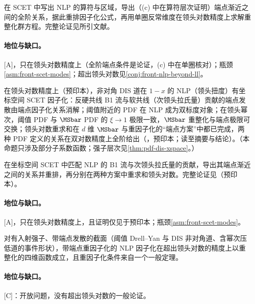 \begin{proofsketch}
在 SCET 中写出 NLP 的算符与区域，导出（(c) 中在算符层次证明）端点渐近之间的全阶关系，据此重排因子化公式，再用单圈反常维度在领头对数精度上求解重整化群方程。完整论证见所引文献。
\end{proofsketch}

\paragraph{地位与缺口。}[A]，只在领头对数精度上（全阶端点条件是论证，(c) 中在单圈核对）；瓶颈\cref{asm:front-scet-modes}；超出领头对数见\cref{conj:front-nlp-beyond-ll}。

\begin{proposition}\label{prop:front-nlp-dis}
在领头对数精度上（预印本），非对角 DIS 道在 $1-x$ 的 NLP（领头扭度）有坐标空间 SCET 因子化：反硬共线 B1 流与软共线（次领头拉氏量）贡献的端点发散由端点因子化关系消解；阈值附近的 PDF 在 NLP 成为双标度对象；在领头幂次，阈值 PDF 与 $\MSbar$ PDF 的 $\xi\to1$ 极限一致，$\MSbar$ 重整化与端点极限可交换；领头对数重求和在 $d$ 维 $\MSbar$ 与重因子化的“端点方案”中都已完成，两种 PDF 定义的关系在双对数精度上全阶给出（\cite{Beneke:2026miy}，预印本；读至摘要与结论）。（本命题只涉及部分子系数函数；强子层次见\cref{thm:pdf-dis-xspace}。）
\end{proposition}

\begin{proofsketch}
在坐标空间 SCET 中匹配 NLP 的 B1 流与次领头拉氏量的贡献，导出其端点渐近之间的关系并重排，再分别在两种方案中重求和领头对数。完整论证见\cite{Beneke:2026miy}（预印本）。
\end{proofsketch}

\paragraph{地位与缺口。}[A]，只在领头对数精度上，且证明仅见于预印本；瓶颈\cref{asm:front-scet-modes}。

\begin{conjecture}\label{conj:front-nlp-beyond-ll}
对有入射强子、带端点发散的截面（阈值 Drell--Yan 与 DIS 非对角道、含幂次压低道的事件形状），带端点重因子化的 NLP 因子化在超出领头对数的精度上以重整化的四维函数成立，且重因子化条件来自一个一般定理。
\end{conjecture}

\paragraph{地位与缺口。}[C]：开放问题，没有超出领头对数的一般论证。
